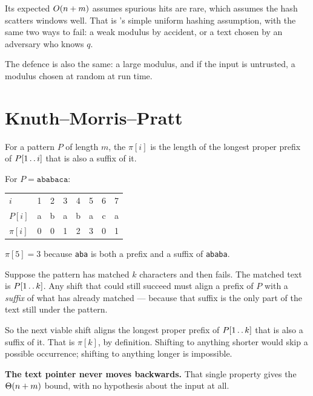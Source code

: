 \begin{alertbox}
Its expected $O(n+m)$ assumes spurious hits are rare, which assumes the
hash scatters windows well. That is 's simple uniform hashing
assumption, with the same two ways to fail: a weak modulus by accident, or a
text chosen by an adversary who knows $q$.

\smallskip
The defence is also the same: a large modulus, and if the input is untrusted, a
modulus chosen at random at run time.
\end{alertbox}

\section{Knuth--Morris--Pratt}

\begin{definitionbox}
For a pattern $P$ of length $m$, the 
$\pi[i]$ is the length of the longest proper prefix of
$P[1 \mathinner{\ldotp\ldotp} i]$ that is also a suffix of it.

\smallskip
For $P = \texttt{ababaca}$:
\begin{center}
\begin{tabular}{@{}lccccccc@{}}
$i$      & 1 & 2 & 3 & 4 & 5 & 6 & 7 \\
$P[i]$   & a & b & a & b & a & c & a \\
$\pi[i]$ & 0 & 0 & 1 & 2 & 3 & 0 & 1 \\
\end{tabular}
\end{center}
$\pi[5] = 3$ because \texttt{aba} is both a prefix and a suffix of
\texttt{ababa}.
\end{definitionbox}

\begin{conceptbox}
Suppose the pattern has matched $k$ characters and then fails. The matched text
is $P[1 \mathinner{\ldotp\ldotp} k]$. Any shift that could still succeed must
align a prefix of $P$ with a \emph{suffix} of what has already matched ---
because that suffix is the only part of the text still under the pattern.

\smallskip
So the next viable shift aligns the longest proper prefix of
$P[1\mathinner{\ldotp\ldotp}k]$ that is also a suffix of it. That is
$\pi[k]$, by definition. Shifting to anything shorter would skip a possible
occurrence; shifting to anything longer is impossible.

\smallskip
\textbf{The text pointer never moves backwards.} That single property gives
the $\Theta(n+m)$ bound, with no hypothesis about the input at all.
\end{conceptbox}

